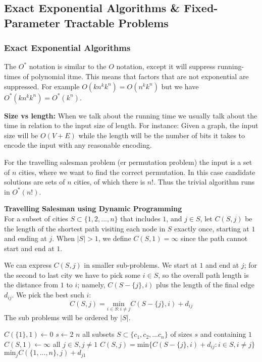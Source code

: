 \subsection{Exact Exponential Algorithms \& Fixed-Parameter Tractable Problems}

\subsubsection{Exact Exponential Algorithms}
The $O^*$ notation is similar to the $O$ notation, except it will suppress
running-times of polynomial itme. This means that factors that are not
exponential are suppressed. For example $O(kn^kk^n) = O(n^kk^n)$ but we have
$O^*(kn^kk^n) = O^*(k^n)$.

\noindent \textbf{Size vs length:} When we talk about the running time we usually talk about
the time in relation to the input size of length. For instance: Given a graph, the input size
will be $O(V + E)$ while the length will be the number of bits it takes to encode the input with any reasonable encoding.

For the travelling salesman problem (er permutation problem) the input is a set of $n$ cities, where we want to find
the correct permutation. In this case candidate solutions are sets of $n$ cities, of which there is $n!$. Thus
the trivial algorithm runs in $O^*(n!)$.

\noindent \textbf{Travelling Salesman using Dynamic Programming} \\
For a subset of cities $S \subset \{1,2,...,n\}$ that includes $1$, and $j \in S$, let $C(S,j)$ be
the length of the shortest path visiting each node in $S$ exactly once, starting at $1$ and ending at $j$.
When $|S| > 1$, we define $C(S,1) = \infty$ since the path cannot start and end at $1$.

We can express $C(S,j)$ in smaller sub-problems. We start at $1$ and end at $j$; for the second to last
city we have to pick some $i \in S$, so the overall path length is the distance from $1$ to $i$; namely,
$C(S-\{j\},i)$ plus the length of the final edge $d_{ij}$. We pick the best such $i$:
\[
  C(S,j) = \underset{i\in S:i\neq j}{\text{min}} C(S-\{j\},i)+d_{ij}
\]
The sub problems will be ordered by $|S|$.

\begin{codebox}
\li $C(\{1\},1) \gets 0$
\li \For $s \gets 2$ \To $n$ \Do
\li   \For all subsets $S \subset \{c_1,c_2,...c_n\}$ of sizes $s$ and containing $1$ \Do
\li     $C(S,1) \gets \infty$
\li     \For all $j \in S, j\neq 1$ \Do
\li       $C(S,j) = \text{min}\{C(S-\{j\},i) + d_{ij} : i \in S, i \neq j\}$ \End\End\End
\li \Return $\text{min}_jC(\{1,...,n\},j) + d_{j1}$
\end{codebox}


